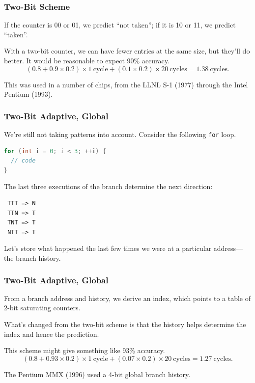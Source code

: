 \begin{frame}
\frametitle{Two-Bit Scheme}

If the counter is 00 or 01, we predict ``not taken''; if it is 10 or
11, we predict ``taken''.

With a two-bit counter, we can have fewer entries at the same size, but they'll do better.
It would be reasonable to expect 90\% accuracy.
\[
(0.8 + 0.9 \times 0.2) \times 1 \mathrm{~cycle} + (0.1 \times 0.2) \times 20 \mathrm{~cycles} = 1.38 \mathrm{~cycles}.
\]

This was used in a number of chips, from the LLNL S-1 (1977) through the Intel Pentium (1993).



\end{frame}


\begin{frame}[fragile]
\frametitle{Two-Bit Adaptive, Global}

We're still not taking patterns into account. Consider the following {\tt for} loop.
\begin{lstlisting}[language=C]
for (int i = 0; i < 3; ++i) {
  // code
}
\end{lstlisting}
The last three executions of the branch determine the next direction:
\begin{verbatim}
 TTT => N
 TTN => T
 TNT => T
 NTT => T
\end{verbatim}

Let's store what happened the last few times we were at a particular address---the
\alert{branch history}. 

\end{frame}



\begin{frame}
\frametitle{Two-Bit Adaptive, Global}

From a branch address and history, we derive an index, which
points to a table of 2-bit saturating counters. 

What's changed from the two-bit scheme
is that the history helps determine the index and hence the prediction.

This scheme might give something like 93\% accuracy.
\[
(0.8 + 0.93 \times 0.2) \times 1 \mathrm{~cycle} + (0.07 \times 0.2) \times 20 \mathrm{~cycles} = 1.27 \mathrm{~cycles}.
\]

The Pentium MMX (1996) used a 4-bit global branch history.

\end{frame}



